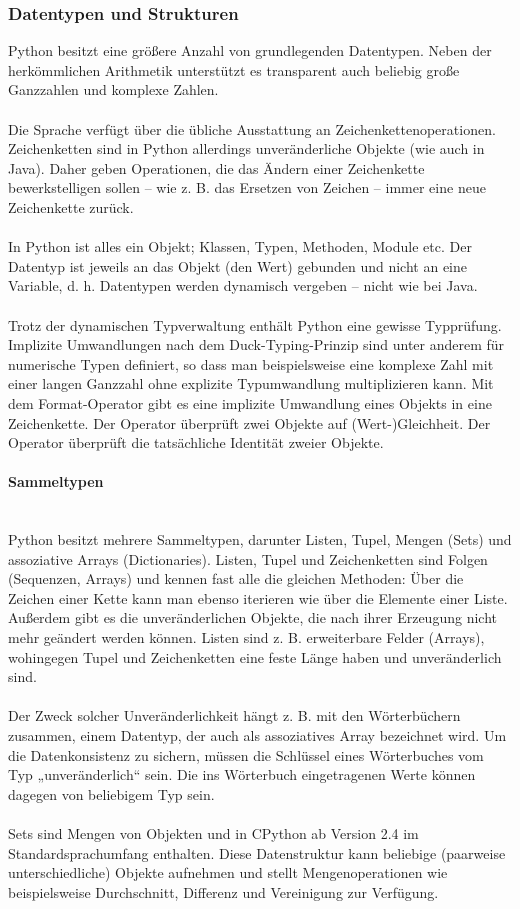 \subsubsection{Datentypen und Strukturen}
Python besitzt eine größere Anzahl von grundlegenden Datentypen. Neben der herkömmlichen Arithmetik unterstützt es transparent auch beliebig große Ganzzahlen und komplexe Zahlen.\\
\\
Die Sprache verfügt über die übliche Ausstattung an Zeichenkettenoperationen. Zeichenketten sind in Python allerdings unveränderliche Objekte (wie auch in Java). Daher geben Operationen, die das Ändern einer Zeichenkette bewerkstelligen sollen – wie z. B. das Ersetzen von Zeichen – immer eine neue Zeichenkette zurück.\\
\\
In Python ist alles ein Objekt; Klassen, Typen, Methoden, Module etc. Der Datentyp ist jeweils an das Objekt (den Wert) gebunden und nicht an eine Variable, d. h. Datentypen werden dynamisch vergeben – nicht wie bei Java.\\
\\
Trotz der dynamischen Typverwaltung enthält Python eine gewisse Typprüfung. Implizite Umwandlungen nach dem Duck-Typing-Prinzip sind unter anderem für numerische Typen definiert, so dass man beispielsweise eine komplexe Zahl mit einer langen Ganzzahl ohne explizite Typumwandlung multiplizieren kann. Mit dem Format-Operator \displaycode{\%} gibt es eine implizite Umwandlung eines Objekts in eine Zeichenkette. Der Operator \displaycode{==} überprüft zwei Objekte auf (Wert-)Gleichheit. Der Operator  überprüft die tatsächliche Identität zweier Objekte.

\paragraph{Sammeltypen}\ \\
Python besitzt mehrere Sammeltypen, darunter Listen, Tupel, Mengen (Sets) und assoziative Arrays (Dictionaries). Listen, Tupel und Zeichenketten sind Folgen (Sequenzen, Arrays) und kennen fast alle die gleichen Methoden: Über die Zeichen einer Kette kann man ebenso iterieren wie über die Elemente einer Liste. Außerdem gibt es die unveränderlichen Objekte, die nach ihrer Erzeugung nicht mehr geändert werden können. Listen sind z. B. erweiterbare Felder (Arrays), wohingegen Tupel und Zeichenketten eine feste Länge haben und unveränderlich sind.\\
\\
Der Zweck solcher Unveränderlichkeit hängt z. B. mit den Wörterbüchern zusammen, einem Datentyp, der auch als assoziatives Array bezeichnet wird. Um die Datenkonsistenz zu sichern, müssen die Schlüssel eines Wörterbuches vom Typ „unveränderlich“ sein. Die ins Wörterbuch eingetragenen Werte können dagegen von beliebigem Typ sein.\\
\\
Sets sind Mengen von Objekten und in CPython ab Version 2.4 im Standardsprachumfang enthalten. Diese Datenstruktur kann beliebige (paarweise unterschiedliche) Objekte aufnehmen und stellt Mengenoperationen wie beispielsweise Durchschnitt, Differenz und Vereinigung zur Verfügung.

